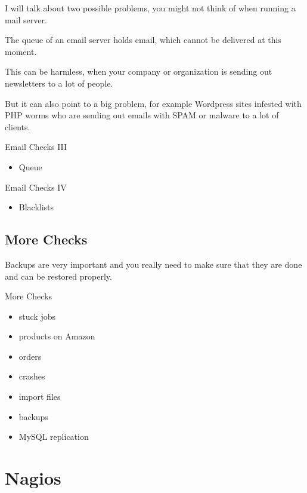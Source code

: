 I will talk about two possible problems,
you might not think of when running a mail server.

The queue of an email server holds email, which
cannot be delivered at this moment.

This can be harmless, when your company or organization
is sending out newsletters to a lot of people.

But it can also point to a big problem, for example
Wordpress sites infested with PHP worms who are
sending out emails with SPAM or malware to a lot
of clients.

\begin{frame}{Email Checks III}
\begin{itemize}
\item Queue
\end{itemize}
\end{frame}

\begin{frame}{Email Checks IV}
\begin{itemize}
\item Blacklists
\end{itemize}
\end{frame}

\subsection{More Checks}

Backups are very important and you really need to make sure
that they are done and can be restored properly.

\begin{frame}[fragile]{More Checks}

\begin{itemize}
\item stuck jobs
\item products on Amazon
\item orders
\item crashes
\item import files
\item backups
\item MySQL replication
\end{itemize}
\end{frame}

\section{Nagios}

